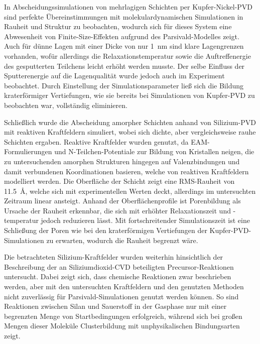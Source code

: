 In Abscheidungssimulationen von mehrlagigen Schichten per Kupfer-Nickel-PVD sind perfekte Übereinstimmungen mit molekulardynamischen Simulationen in Rauheit und Struktur zu beobachten, wodurch sich für dieses System eine Abwesenheit von Finite-Size-Effekten aufgrund des Parsivald-Modelles zeigt.
Auch für dünne Lagen mit einer Dicke von nur \SI{1}{\nano\meter} sind klare Lagengrenzen vorhanden, wofür allerdings die Relaxationstemperatur sowie die Auftreffenergie des gesputterten Teilchens leicht erhöht werden musste.
Der selbe Einfluss der Sputterenergie auf die Lagenqualität wurde jedoch auch im Experiment beobachtet.
Durch Einstellung der Simulationsparameter ließ sich die Bildung kraterförmiger Vertiefungen, wie sie bereits bei Simulationen von Kupfer-PVD zu beobachten war, vollständig eliminieren.

Schließlich wurde die Abscheidung amorpher Schichten anhand von Silizium-PVD mit reaktiven Kraftfeldern simuliert, wobei sich dichte, aber vergleichsweise rauhe Schichten ergaben.
Reaktive Kraftfelder wurden genutzt, da EAM-Formulierungen und N-Teilchen-Potentiale zur Bildung von Kristallen neigen, die zu untersuchenden amorphen Strukturen hingegen auf Valenzbindungen und damit verbundenen Koordinationen basieren, welche von reaktiven Kraftfeldern modelliert werden.
Die Oberfläche der Schicht zeigt eine RMS-Rauheit von \SI{11.5}{\angstrom}, welche sich mit experimentellen Werten deckt, allerdings im untersuchten Zeitraum linear ansteigt.
Anhand der Oberflächenprofile ist Porenbildung als Ursache der Rauheit erkennbar, die sich mit erhöhter Relaxationszeit und -temperatur jedoch reduzieren lässt.
Mit fortschreitender Simulationszeit ist eine Schließung der Poren wie bei den kraterförmigen Vertiefungen der Kupfer-PVD-Simulationen zu erwarten, wodurch die Rauheit begrenzt wäre.


Die betrachteten Silizium-Kraftfelder wurden weiterhin hinsichtlich der Beschreibung der an Siliziumdioxid-CVD beteiligten Precursor-Reaktionen untersucht.
Dabei zeigt sich, dass chemische Reaktionen zwar beschrieben werden, aber mit den untersuchten Kraftfeldern und den genutzten Methoden nicht zuverlässig für Parsivald-Simulationen genutzt werden können.
So sind Reaktionen zwischen Silan und Sauerstoff in der Gasphase nur mit einer begrenzten Menge von Startbedingungen erfolgreich, während sich bei großen Mengen dieser Moleküle Clusterbildung mit unphysikalischen Bindungsarten zeigt.

